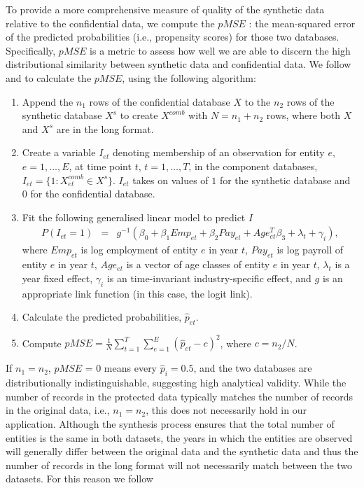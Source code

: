 To provide a more comprehensive measure of  quality of the synthetic data relative to the confidential data, we compute the $pMSE$ \parencite[propensity score mean-squared error,][]{Woo_Reiter_Oganian_Karr_2009,SnokeSlavkovic2018,Snoke_RSSA2018}: the mean-squared error of the predicted probabilities (i.e., propensity scores) for those two databases. Specifically, $pMSE$ is a metric to assess how well we are able to discern the high distributional similarity between synthetic data and confidential data. %
%
We follow  \textcite{Woo_Reiter_Oganian_Karr_2009} and \textcite{SnokeSlavkovic2018} to calculate the $pMSE$, using the following algorithm:  
\begin{enumerate}
    \item Append the $n_1$ rows of the confidential database $X$ to the $n_2$ rows of the synthetic database $X^s$ to create $X^{comb}$ with $N=n_1 + n_2$ rows, where both $X$ and $X^s$ are in the long format.
    \item Create a variable $I_{et}$ denoting membership of an observation for entity $e$, $e=1,\ldots,E$, at time point $t$, $t=1,\ldots,T$, in the component databases,  $I_{et}=\{1: X^{comb}_{et} \in X^s\}$. $I_{et}$ takes on values of $1$ for the synthetic database and $0$ for the confidential database. 
    \item Fit the following generalised linear model to predict $I$
    \begin{eqnarray}	
        P(I_{et}=1) & = &g^{-1}(\beta_0 + \beta_{1} Emp_{et} + \beta_{2} Pay_{et} + Age_{et}^{T}\beta_{3} + \lambda_t + \gamma_i), \label{pMSE}
     \end{eqnarray}
         where $Emp_{et}$ is  log employment  of entity $e$ in year $t$, $Pay_{et}$ is  log payroll of entity $e$ in year $t$, $Age_{et}$ is a vector of age classes of entity $e$ in year $t$, $\lambda_t$ is a year fixed effect, $\gamma_i$ is an time-invariant industry-specific effect, and $g$ is an appropriate link function (in this case, the logit link).
    \item Calculate the predicted probabilities, $\hat{p}_{et}$.
    \item Compute  $pMSE=\frac{1}{N}\sum_{t=1}^T\sum_{e=1}^E(\hat{p}_{et} - c)^2$, where $c=n_2/N$.
\end{enumerate}
If $n_1 = n_2$, $pMSE$ = 0 means every $\hat{p}_i = 0.5$, and the two databases are distributionally indistinguishable, suggesting  high analytical validity. While the number of records in the protected data typically matches the number of records in the original data, i.e., $n_1 = n_2$, this does not necessarily hold in our application. Although the synthesis process ensures that the total number of entities is the same in both datasets, the years in which the entities are observed will generally differ between the original data and the synthetic data and thus the number of records in the long format will not necessarily match between the two datasets. For this reason we follow 
